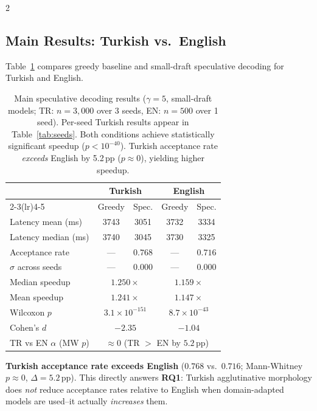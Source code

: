 \documentclass[11pt,a4paper]{article}
\begin{document}
\begin{multicols}{2}
\subsection{Main Results: Turkish vs.\ English}
\label{sec:main}

Table~\ref{tab:main} compares greedy baseline and small-draft speculative
decoding for Turkish and English.

\begin{table}[t]
\centering
\small
\begin{tabular}{lcccc}
\toprule
& \multicolumn{2}{c}{\textbf{Turkish}} &
  \multicolumn{2}{c}{\textbf{English}} \\
\cmidrule(lr){2-3}\cmidrule(lr){4-5}
& Greedy & Spec. & Greedy & Spec. \\
\midrule
Latency mean (ms) & 3743 & 3051 & 3732 & 3334 \\
Latency median (ms)& 3740 & 3045 & 3730 & 3325 \\
\midrule
Acceptance rate   & — & $0.768$ & — & $0.716$ \\
$\sigma$ across seeds & — & $0.000$ & — & $0.000$ \\
\midrule
Median speedup    & \multicolumn{2}{c}{{\color{goodgreen}$\mathbf{1.250\times}$}} &
                    \multicolumn{2}{c}{{\color{goodgreen}$\mathbf{1.159\times}$}} \\
Mean speedup      & \multicolumn{2}{c}{$1.241\times$} &
                    \multicolumn{2}{c}{$1.147\times$} \\
Wilcoxon $p$      & \multicolumn{2}{c}{$3.1\!\times\!10^{-151}$} &
                    \multicolumn{2}{c}{$8.7\!\times\!10^{-43}$} \\
Cohen's $d$       & \multicolumn{2}{c}{$-2.35$} &
                    \multicolumn{2}{c}{$-1.04$} \\
\midrule
TR vs EN $\alpha$ (MW $p$) & \multicolumn{4}{c}{${\approx}0$ (TR $>$ EN by $5.2$\,pp)} \\
\bottomrule
\end{tabular}
\caption{Main speculative decoding results ($\gamma=5$, small-draft
models; TR: $n=3{,}000$ over 3 seeds, EN: $n=500$ over 1 seed).
Per-seed Turkish results appear in Table~\ref{tab:seeds}.
Both conditions achieve statistically significant speedup ($p < 10^{-40}$).
Turkish acceptance rate \emph{exceeds} English by 5.2\,pp ($p \approx 0$),
yielding higher speedup.}
\label{tab:main}
\end{table}

\textbf{Turkish acceptance rate exceeds English} ($0.768$ vs.\ $0.716$;
Mann-Whitney $p \approx 0$, $\Delta = 5.2$\,pp).
This directly answers \textbf{RQ1}: Turkish agglutinative morphology
does \emph{not} reduce acceptance rates relative to English when
domain-adapted models are used--it actually \emph{increases} them.


\end{multicols}
\end{document}
